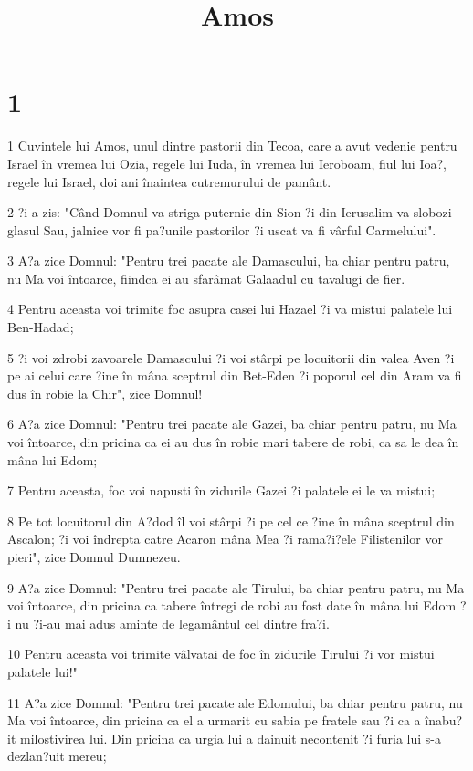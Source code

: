 

\title{Amos}


\chapter{1}

\par 1 Cuvintele lui Amos, unul dintre pastorii din Tecoa, care a avut vedenie pentru Israel în vremea lui Ozia, regele lui Iuda, în vremea lui Ieroboam, fiul lui Ioa?, regele lui Israel, doi ani înaintea cutremurului de pamânt.
\par 2 ?i a zis: "Când Domnul va striga puternic din Sion ?i din Ierusalim va slobozi glasul Sau, jalnice vor fi pa?unile pastorilor ?i uscat va fi vârful Carmelului".
\par 3 A?a zice Domnul: "Pentru trei pacate ale Damascului, ba chiar pentru patru, nu Ma voi întoarce, fiindca ei au sfarâmat Galaadul cu tavalugi de fier.
\par 4 Pentru aceasta voi trimite foc asupra casei lui Hazael ?i va mistui palatele lui Ben-Hadad;
\par 5 ?i voi zdrobi zavoarele Damascului ?i voi stârpi pe locuitorii din valea Aven ?i pe ai celui care ?ine în mâna sceptrul din Bet-Eden ?i poporul cel din Aram va fi dus în robie la Chir", zice Domnul!
\par 6 A?a zice Domnul: "Pentru trei pacate ale Gazei, ba chiar pentru patru, nu Ma voi întoarce, din pricina ca ei au dus în robie mari tabere de robi, ca sa le dea în mâna lui Edom;
\par 7 Pentru aceasta, foc voi napusti în zidurile Gazei ?i palatele ei le va mistui;
\par 8 Pe tot locuitorul din A?dod îl voi stârpi ?i pe cel ce ?ine în mâna sceptrul din Ascalon; ?i voi îndrepta catre Acaron mâna Mea ?i rama?i?ele Filistenilor vor pieri", zice Domnul Dumnezeu.
\par 9 A?a zice Domnul: "Pentru trei pacate ale Tirului, ba chiar pentru patru, nu Ma voi întoarce, din pricina ca tabere întregi de robi au fost date în mâna lui Edom ?i nu ?i-au mai adus aminte de legamântul cel dintre fra?i.
\par 10 Pentru aceasta voi trimite vâlvatai de foc în zidurile Tirului ?i vor mistui palatele lui!"
\par 11 A?a zice Domnul: "Pentru trei pacate ale Edomului, ba chiar pentru patru, nu Ma voi întoarce, din pricina ca el a urmarit cu sabia pe fratele sau ?i ca a înabu?it milostivirea lui. Din pricina ca urgia lui a dainuit necontenit ?i furia lui s-a dezlan?uit mereu;
